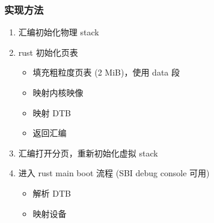 \begin{frame}
    \frametitle{实现方法}

    \begin{enumerate}
        \item 汇编初始化物理 stack
        \item rust 初始化页表
              \begin{itemize}
                  \item 填充粗粒度页表 (2 MiB)，使用 data 段
                  \item 映射内核映像
                  \item 映射 DTB
                  \item 返回汇编
              \end{itemize}
        \item 汇编打开分页，重新初始化虚拟 stack
        \item 进入 rust main boot 流程 (SBI debug console 可用)
              \begin{itemize}
                  \item 解析 DTB
                  \item 映射设备
              \end{itemize}

    \end{enumerate}


\end{frame}
